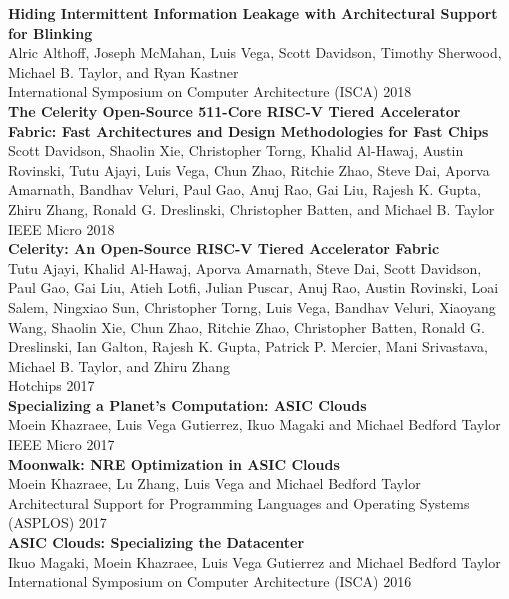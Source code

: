 \documentclass[10pt]{article}
\begin{document}
\textbf{%
  Hiding Intermittent Information Leakage with Architectural Support for Blinking
} \\
Alric Althoff, Joseph McMahan, Luis Vega, Scott Davidson, Timothy Sherwood,
Michael B. Taylor, and Ryan Kastner \\
International Symposium on Computer Architecture (ISCA) 2018 \\
  
\textbf{%
  The Celerity Open-Source 511-Core RISC-V Tiered Accelerator Fabric: Fast Architectures and Design Methodologies for Fast Chips
} \\
Scott Davidson, Shaolin Xie, Christopher Torng, Khalid Al-Hawaj, Austin Rovinski,
Tutu Ajayi, Luis Vega, Chun Zhao, Ritchie Zhao, Steve Dai, Aporva Amarnath,
Bandhav Veluri, Paul Gao, Anuj Rao, Gai Liu, Rajesh K. Gupta, Zhiru Zhang,
Ronald G. Dreslinski, Christopher Batten, and Michael B. Taylor \\
IEEE Micro 2018 \\

\textbf{%
  Celerity: An Open-Source RISC-V Tiered Accelerator Fabric
} \\
Tutu Ajayi, Khalid Al-Hawaj, Aporva Amarnath, Steve Dai, Scott Davidson,
Paul Gao, Gai Liu, Atieh Lotfi, Julian Puscar, Anuj Rao, Austin Rovinski,
Loai Salem, Ningxiao Sun, Christopher Torng, Luis Vega, Bandhav Veluri,
Xiaoyang Wang, Shaolin Xie, Chun Zhao, Ritchie Zhao, Christopher Batten,
Ronald G. Dreslinski, Ian Galton, Rajesh K. Gupta, Patrick P. Mercier,
Mani Srivastava, Michael B. Taylor, and Zhiru Zhang \\
Hotchips 2017 \\

\textbf{%
  Specializing a Planet's Computation: ASIC Clouds
} \\
Moein Khazraee, Luis Vega Gutierrez, Ikuo Magaki and Michael Bedford Taylor \\
IEEE Micro 2017 \\

\textbf{%
  Moonwalk: NRE Optimization in ASIC Clouds
} \\
Moein Khazraee, Lu Zhang, Luis Vega and Michael Bedford Taylor \\
Architectural Support for Programming Languages and Operating Systems (ASPLOS) 2017 \\

\textbf{%
  ASIC Clouds: Specializing the Datacenter
} \\
Ikuo Magaki, Moein Khazraee, Luis Vega Gutierrez and Michael Bedford Taylor \\
International Symposium on Computer Architecture (ISCA) 2016 \\
\end{document}
